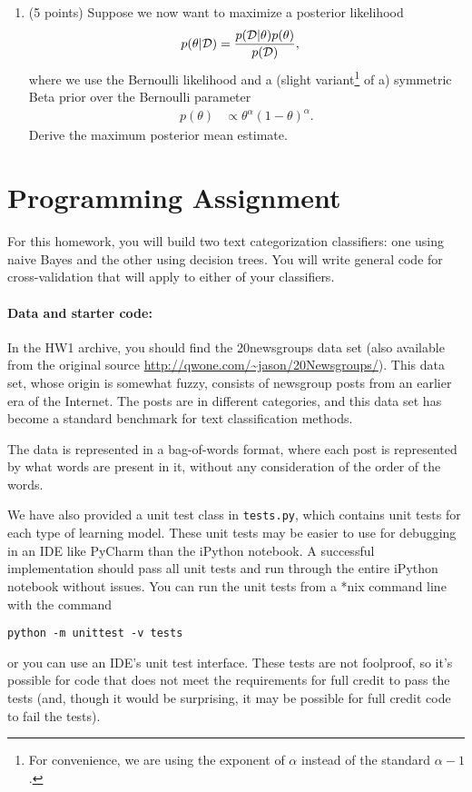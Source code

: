\documentclass[10pt]{article}
\begin{document}
\begin{enumerate}
\begin{enumerate}
\item (5 points) Suppose we now want to maximize a posterior likelihood
\begin{align}
p(\theta | {\cal D}) &= \frac{p({\cal D} | \theta) p(\theta)}{p({\cal D})},
\end{align}
where we use the Bernoulli likelihood and a (slight variant\footnote{For convenience, we are using the exponent of $\alpha$ instead of the standard $\alpha-1$.} of a) symmetric Beta prior over the Bernoulli parameter
\begin{align}
p(\theta) &\propto \theta^{\alpha} (1 - \theta)^{\alpha}.
\end{align}
Derive the maximum posterior mean estimate.

\end{enumerate}

\end{enumerate}

\section*{Programming Assignment}

For this homework, you will build two text categorization classifiers: one using naive Bayes and the other using decision trees. You will write general code for cross-validation that will apply to either of your classifiers. 

\paragraph{Data and starter code:} In the HW1 archive, you should find the 20newsgroups data set (also available from the original source \url{http://qwone.com/~jason/20Newsgroups/}). This data set, whose origin is somewhat fuzzy, consists of newsgroup posts from an earlier era of the Internet. The posts are in different categories, and this data set has become a standard benchmark for text classification methods. 

The data is represented in a bag-of-words format, where each post is represented by what words are present in it, without any consideration of the order of the words. 

We have also provided a unit test class in \texttt{tests.py}, which contains unit tests for each type of learning model. These unit tests may be easier to use for debugging in an IDE like PyCharm than the iPython notebook. A successful implementation should pass all unit tests and run through the entire iPython notebook without issues. You can run the unit tests from a *nix command line with the command
\begin{verbatim}
python -m unittest -v tests
\end{verbatim}
or you can use an IDE's unit test interface. These tests are not foolproof, so it's possible for code that does not meet the requirements for full credit to pass the tests (and, though it would be surprising, it may be possible for full credit code to fail the tests).
\end{document}
